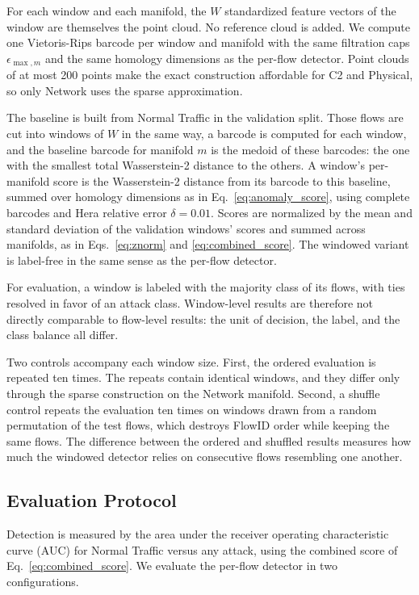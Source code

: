\documentclass[conf]{new-aiaa}
\begin{document}
For each window and each manifold, the $W$ standardized feature vectors of the window are themselves the point cloud. No reference cloud is added. We compute one Vietoris-Rips barcode per window and manifold with the same filtration caps $\epsilon_{\max,m}$ and the same homology dimensions as the per-flow detector. Point clouds of at most 200 points make the exact construction affordable for C2 and Physical, so only Network uses the sparse approximation.

The baseline is built from Normal Traffic in the validation split. Those flows are cut into windows of $W$ in the same way, a barcode is computed for each window, and the baseline barcode for manifold $m$ is the medoid of these barcodes: the one with the smallest total Wasserstein-2 distance to the others. A window's per-manifold score is the Wasserstein-2 distance from its barcode to this baseline, summed over homology dimensions as in Eq.~\eqref{eq:anomaly_score}, using complete barcodes and Hera relative error $\delta = 0.01$. Scores are normalized by the mean and standard deviation of the validation windows' scores and summed across manifolds, as in Eqs.~\eqref{eq:znorm} and \eqref{eq:combined_score}. The windowed variant is label-free in the same sense as the per-flow detector.

For evaluation, a window is labeled with the majority class of its flows, with ties resolved in favor of an attack class. Window-level results are therefore not directly comparable to flow-level results: the unit of decision, the label, and the class balance all differ.

Two controls accompany each window size. First, the ordered evaluation is repeated ten times. The repeats contain identical windows, and they differ only through the sparse construction on the Network manifold. Second, a shuffle control repeats the evaluation ten times on windows drawn from a random permutation of the test flows, which destroys FlowID order while keeping the same flows. The difference between the ordered and shuffled results measures how much the windowed detector relies on consecutive flows resembling one another.

\subsection{Evaluation Protocol}
\label{sec:protocol}

Detection is measured by the area under the receiver operating characteristic curve (AUC) for Normal Traffic versus any attack, using the combined score of Eq.~\eqref{eq:combined_score}. We evaluate the per-flow detector in two configurations.
\end{document}
